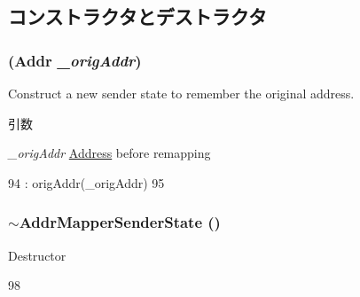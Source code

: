 \subsection{コンストラクタとデストラクタ}
\hypertarget{classAddrMapper_1_1AddrMapperSenderState_ad4879e163df1e1cf3466269e7d12d279}{
\subsubsection[{AddrMapperSenderState}]{ ({\bf Addr} {\em \_\-origAddr})}}
\label{classAddrMapper_1_1AddrMapperSenderState_ad4879e163df1e1cf3466269e7d12d279}
Construct a new sender state to remember the original address.


\begin{DoxyParams}{引数}
\item[{\em \_\-origAddr}]\hyperlink{classAddress}{Address} before remapping \end{DoxyParams}



\begin{DoxyCode}
94                                               : origAddr(_origAddr)
95         { }
\end{DoxyCode}
\hypertarget{classAddrMapper_1_1AddrMapperSenderState_a2dd0b868a2e7ae54d3a56dbdb0edfa60}{
\subsubsection[{$\sim$AddrMapperSenderState}]{\setlength{\rightskip}{0pt plus 5cm}$\sim${\bf AddrMapperSenderState} ()}}
\label{classAddrMapper_1_1AddrMapperSenderState_a2dd0b868a2e7ae54d3a56dbdb0edfa60}
Destructor 


\begin{DoxyCode}
98 { }
\end{DoxyCode}


